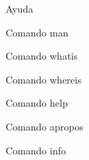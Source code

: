 \begin{section}{Ayuda}

\begin{subsection}{Comando man}
\end{subsection}

\begin{subsection}{Comando whatis}
\end{subsection}

\begin{subsection}{Comando whereis}
\end{subsection}

\begin{subsection}{Comando help}
\end{subsection}

\begin{subsection}{Comando apropos}
\end{subsection}

\begin{subsection}{Comando info}
\end{subsection}

\end{section}